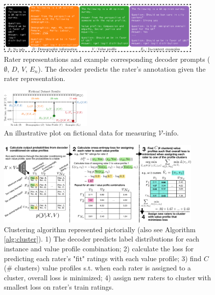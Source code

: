 \documentclass[11pt]{article}
\begin{document}
\begin{figure}[t]
\centering
\includegraphics[width=0.9\textwidth]{files/raterreplarge-cropped.pdf}
\small
\caption{Rater representations and example corresponding decoder prompts
($\emptyset$, $D$, $V$, $E_n$).
The decoder predicts the rater's annotation given the rater representation.
}
\label{fig:raterrep}
\end{figure}

\begin{figure}
\centering
\includegraphics[width=0.4\textwidth]{files/annotated_example_v2.pdf}
\small

\caption{
An illustrative plot on fictional data for measuring $\mathcal{V}$-info.
}
\label{fig:example}
\end{figure}

\begin{figure}[ht]
\centering
\includegraphics[width=0.9\textwidth]{files/clusterfig.pdf}
\small
\caption{Clustering algorithm represented pictorially (also see Algorithm \ref{alg:cluster}).
1) The decoder predicts label distributions for each instance and value profile combination;
2) calculate the loss for predicting each rater's "fit" ratings with each value profile;
3) find $C$ (\# clusters) value profiles s.t. when each rater is assigned to a cluster, overall loss is minimized;
4) assign new raters to cluster with smallest loss on rater's train ratings.
}
\label{fig:clusteralgo}
\end{figure}
\end{document}
